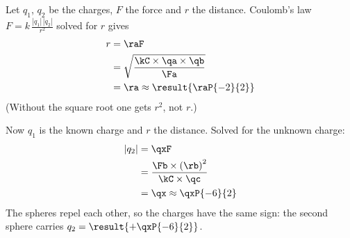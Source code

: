 \begin{abcliste}
\abc Let $q_1$, $q_2$ be the charges, $F$ the force and $r$ the distance. Coulomb's law $F = k\,\frac{|q_1|\,|q_2|}{r^2}$ solved for $r$ gives
\begin{align}
 r &= \raF \\
   &= \sqrt{\frac{\kC\times\qa\times\qb}{\Fa}} \\
   &= \ra \approx \result{\raP{-2}{2}}
\end{align}
(Without the square root one gets $r^2$, not $r$.)

\abc Now $q_1$ is the known charge and $r$ the distance. Solved for the unknown charge:
\begin{align}
 |q_2| &= \qxF \\
   &= \frac{\Fb\times\left(\rb\right)^2}{\kC\times\qc} \\
   &= \qx \approx \qxP{-6}{2}
\end{align}
The spheres repel each other, so the charges have the same sign: the second sphere carries $q_2 = \result{+\qxP{-6}{2}}$.
\end{abcliste}
